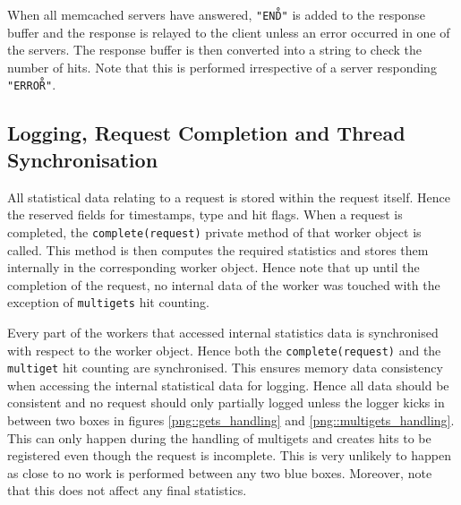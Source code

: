 \documentclass[11pt,a4paper]{article}
\begin{document}
When all memcached servers have answered, \texttt{"END\r\n"} is added to the response buffer and the response is relayed to the client unless an error occurred in one of the servers. The response buffer is then converted into a string to check the number of hits. Note that this is performed irrespective of a server responding \texttt{"ERROR\r\n"}.


\subsection{Logging, Request Completion and Thread Synchronisation}
All statistical data relating to a request is stored within the request itself. Hence the reserved fields for timestamps, type and hit flags. When a request is completed, the \texttt{complete(request)} private method of that worker object is called. This method is then computes the required statistics and stores them internally in the corresponding worker object. Hence note that up until the completion of the request, no internal data of the worker was touched with the exception of \texttt{multigets} hit counting.

Every part of the workers that accessed internal statistics data is synchronised with respect to the worker object. Hence both the \texttt{complete(request)} and the \texttt{multiget} hit counting are synchronised. This ensures memory data consistency when accessing the internal statistical data for logging. Hence all data should be consistent and no request should only partially logged unless the logger kicks in between two boxes in figures \ref{png::gets_handling} and \ref{png::multigets_handling}. This can only happen during the handling of multigets and creates hits to be registered even though the request is incomplete. This is very unlikely to happen as close to no work is performed between any two blue boxes. Moreover, note that this does not affect any final statistics.
\end{document}

